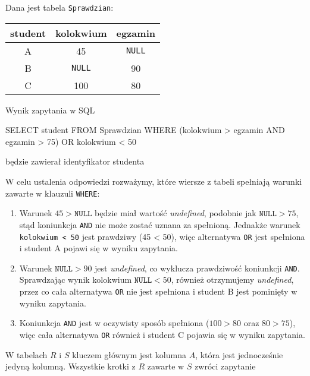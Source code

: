\begin{solutions}
    \sol Dana jest tabela \texttt{Sprawdzian}:
        \begin{center}
        \begin{tabular}{ccc}
        \multicolumn{1}{c}{student} & \multicolumn{1}{c}{kolokwium} & \multicolumn{1}{c}{egzamin} \\ \hline
        A & 45 & \texttt{NULL} \\
        B & \texttt{NULL} & 90 \\
        C & 100 & 80                         
        \end{tabular}
        \end{center}
    Wynik zapytania w SQL
    \begin{sql}
        SELECT student
        FROM Sprawdzian
        WHERE (kolokwium > egzamin AND egzamin > 75) OR kolokwium < 50
    \end{sql}
    będzie zawierał identyfikator studenta

    W celu ustalenia odpowiedzi rozważymy, które wiersze z tabeli spełniają warunki zawarte w klauzuli \texttt{WHERE}:
    \begin{enumerate}[\bf A.]
        \item Warunek $45 > \texttt{NULL}$ będzie miał wartość \textit{undefined}, podobnie jak $\texttt{NULL} > 75$, stąd koniunkcja \texttt{AND} nie może zostać uznana za spełnioną. Jednakże warunek \texttt{kolokwium < 50} jest prawdziwy (45 < 50), więc alternatywa \texttt{OR} jest spełniona i student A pojawi się w wyniku zapytania.
        \item Warunek $\texttt{NULL} > 90$ jest \textit{undefined}, co wyklucza prawdziwość koniunkcji \texttt{AND}. Sprawdzając wynik kolokwium $\texttt{NULL} < 50$, również otrzymujemy \textit{undefined}, przez co cała alternatywa \texttt{OR} nie jest spełniona i student B jest pominięty w wyniku zapytania.
        \item Koniunkcja \texttt{AND} jest w oczywisty sposób spełniona ($100 > 80$ oraz $80 > 75$), więc cała alternatywa \texttt{OR} również i student C pojawia się w wyniku zapytania.
    \end{enumerate}

    \sol W tabelach $R$ i $S$ kluczem głównym jest kolumna $A$, która jest jednocześnie jedyną kolumną. Wszystkie krotki z $R$ zawarte w $S$ zwróci zapytanie
    

\end{solutions}
